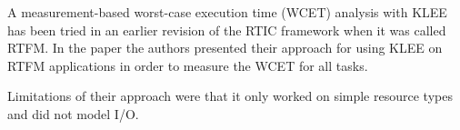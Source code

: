 A measurement-based worst-case execution time (WCET) analysis with KLEE has
been tried in an earlier revision of the RTIC framework\cite{lindner} when it was
called RTFM. In the paper the authors presented their approach for using KLEE on
RTFM applications in order to measure the WCET for all tasks. 

Limitations of their approach were that it only worked on simple resource types and
did not model I/O.
